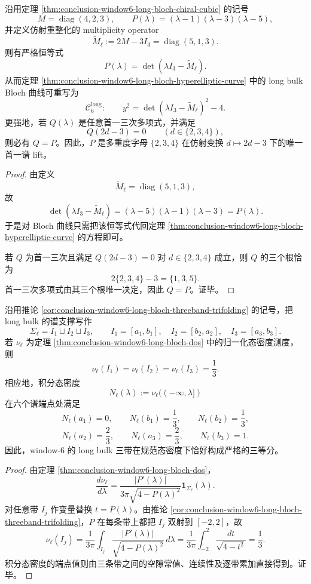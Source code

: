 \begin{theorem}\label{thm:conclusion-window6-long-bulk-unique-affine-spectral-lift}
沿用定理 \ref{thm:conclusion-window6-long-bloch-chiral-cubic} 的记号
\[
M=\operatorname{diag}(4,2,3),
\qquad
P(\lambda)=(\lambda-1)(\lambda-3)(\lambda-5),
\]
并定义仿射重整化的 multiplicity operator
\[
\widetilde M_{\ell}:=2M-3I_3=\operatorname{diag}(5,1,3).
\]
则有严格恒等式
\[
P(\lambda)=\det(\lambda I_3-\widetilde M_{\ell}).
\]
从而定理 \ref{thm:conclusion-window6-long-bloch-hyperelliptic-curve} 中的 long bulk Bloch 曲线可重写为
\[
\mathcal C_6^{\mathrm{long}}:\qquad
y^2=\det(\lambda I_3-\widetilde M_{\ell})^2-4.
\]
更强地，若 \(Q(\lambda)\) 是任意首一三次多项式，并满足
\[
Q(2d-3)=0\qquad (d\in\{2,3,4\}),
\]
则必有 \(Q=P\)。因此，\(P\) 是多重度字母 \(\{2,3,4\}\) 在仿射变换 \(d\mapsto 2d-3\) 下的唯一首一谱 lift。
\end{theorem}
\begin{proof}
由定义
\[
\widetilde M_{\ell}=\operatorname{diag}(5,1,3),
\]
故
\[
\det(\lambda I_3-\widetilde M_{\ell})
=(\lambda-5)(\lambda-1)(\lambda-3)=P(\lambda).
\]
于是对 Bloch 曲线只需把该恒等式代回定理 \ref{thm:conclusion-window6-long-bloch-hyperelliptic-curve} 的方程即可。

若 \(Q\) 为首一三次且满足 \(Q(2d-3)=0\) 对 \(d\in\{2,3,4\}\) 成立，则 \(Q\) 的三个根恰为
\[
2\{2,3,4\}-3=\{1,3,5\}.
\]
首一三次多项式由其三个根唯一决定，因此 \(Q=P\)。证毕。
\end{proof}

\begin{theorem}\label{thm:conclusion-window6-long-bulk-equal-mass-third-law}
沿用推论 \ref{cor:conclusion-window6-long-bloch-threeband-trifolding} 的记号，把 long bulk 的谱支撑写作
\[
\Sigma_{\ell}=I_1\sqcup I_2\sqcup I_3,
\qquad
I_1=[a_1,b_1],\quad I_2=[b_2,a_2],\quad I_3=[a_3,b_3].
\]
若 \(\nu_{\ell}\) 为定理 \ref{thm:conclusion-window6-long-bloch-dos} 中的归一化态密度测度，则
\[
\nu_{\ell}(I_1)=\nu_{\ell}(I_2)=\nu_{\ell}(I_3)=\frac13.
\]
相应地，积分态密度
\[
N_{\ell}(\lambda):=\nu_{\ell}((-\infty,\lambda])
\]
在六个谱端点处满足
\[
N_{\ell}(a_1)=0,\qquad
N_{\ell}(b_1)=\frac13,\qquad
N_{\ell}(b_2)=\frac13,
\]
\[
N_{\ell}(a_2)=\frac23,\qquad
N_{\ell}(a_3)=\frac23,\qquad
N_{\ell}(b_3)=1.
\]
因此，window-\(6\) 的 long bulk 三带在规范态密度下恰好构成严格的三等分。
\end{theorem}
\begin{proof}
由定理 \ref{thm:conclusion-window6-long-bloch-dos}，
\[
\frac{d\nu_{\ell}}{d\lambda}
=
\frac{|P'(\lambda)|}{3\pi\sqrt{4-P(\lambda)^2}}\mathbf 1_{\Sigma_{\ell}}(\lambda).
\]
对任意带 \(I_j\) 作变量替换 \(t=P(\lambda)\)。由推论 \ref{cor:conclusion-window6-long-bloch-threeband-trifolding}，\(P\) 在每条带上都把 \(I_j\) 双射到 \([-2,2]\)，故
\[
\nu_{\ell}(I_j)
=
\frac1{3\pi}\int_{I_j}\frac{|P'(\lambda)|}{\sqrt{4-P(\lambda)^2}}\,d\lambda
=
\frac1{3\pi}\int_{-2}^{2}\frac{dt}{\sqrt{4-t^2}}
=\frac13.
\]
积分态密度的端点值则由三条带之间的空隙常值、连续性及逐带累加直接得到。证毕。
\end{proof}

